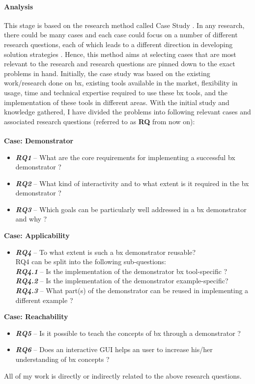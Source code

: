 \paragraph{Analysis}
This stage is based on the research method called Case Study \cite{semethods}. In any research, there could be many cases and each case could focus on a number of different research questions, each of which leads to a different direction in developing solution strategies \cite{semethods}. Hence, this method aims at selecting cases that are most relevant to the research and research questions are pinned down to the exact problems in hand. 
\newline\newline Initially, the case study was based on the existing work/research done on bx, existing tools available in the market, flexibility in usage, time and technical expertise required to use these bx tools, and the implementation of these tools in different areas. With the initial study and knowledge gathered, I have divided the problems into following relevant cases and associated research questions (referred to as \textbf{RQ} from now on):\\\\
\textbf{Case: Demonstrator}
\begin{itemize}
\item {\textbf{\textit{RQ1}} -- What are the core requirements for implementing a successful bx demonstrator ?}
\item {\textbf{\textit{RQ2}} -- What kind of interactivity and to what extent is it required in the bx demonstrator ?}
\item {\textbf{\textit{RQ3}} -- Which goals can be particularly well addressed in a bx demonstrator and why ?}
\end{itemize}
\textbf{Case: Applicability}
\begin{itemize}
\item {\textbf{\textit{RQ4}} -- To what extent is such a bx demonstrator reusable?}
\\RQ4 can be split into the following sub-questions:
\\\textbf{\textit{RQ4.1}} -- Is the implementation of the demonstrator bx tool-specific ?
\\\textbf{\textit{RQ4.2}} -- Is the implementation of the demonstrator example-specific?
\\\textbf{\textit{RQ4.3}} -- What part(s) of the demonstrator can be reused in implementing a different example ?
\end{itemize}
\textbf{Case: Reachability}
\begin{itemize}
\item {\textbf{\textit{RQ5}} -- Is it possible to teach the concepts of bx through a demonstrator ?}
\item {\textbf{\textit{RQ6}} -- Does an interactive GUI helps an user to increase his/her understanding of bx concepts ?}
\end{itemize}
All of my work is directly or indirectly related to the above research questions.

